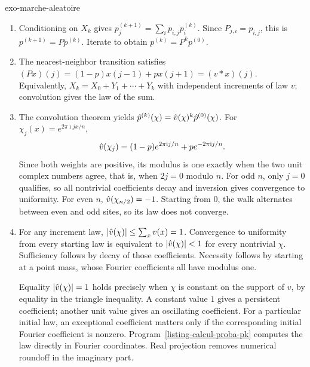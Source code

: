 \begin{correction}{exo-marche-aleatoire}
\begin{enumerate}
\item Conditioning on $X_k$ gives
$p^{(k+1)}_j=\sum_i p_{i,j}p^{(k)}_i$.
Since $P_{j,i}=p_{i,j}$, this is $p^{(k+1)}=Pp^{(k)}$. Iterate to obtain
$p^{(k)}=P^kp^{(0)}$.
\item The nearest-neighbor transition satisfies
$(Px)(j)=(1-p)x(j-1)+px(j+1)=(v*x)(j)$.
Equivalently, $X_k=X_0+Y_1+\cdots+Y_k$ with independent increments of law $v$;
convolution gives the law of the sum.
\item The convolution theorem yields
$\hat{p}^{(k)}(\chi)=\hat{v}(\chi)^k\hat{p}^{(0)}(\chi)$.
For $\chi_j(x)=e^{2\pi\imath jx/n}$,
\[
 \hat{v}(\chi_j)=(1-p)e^{2\pi\mathrm{i} j/n}+pe^{-2\pi\mathrm{i} j/n}.
\]
Since both weights are positive, its modulus is one exactly when the two
unit complex numbers agree, that is, when $2j=0$ modulo $n$.
For odd $n$, only $j=0$ qualifies, so all nontrivial coefficients decay and
inversion gives convergence to uniformity. For even $n$,
$\hat{v}(\chi_{n/2})=-1$. Starting from $0$, the walk alternates between even
and odd sites, so its law does not converge.
\item For any increment law, $|\hat{v}(\chi)|\leq\sum_xv(x)=1$.
Convergence to uniformity from every starting law is equivalent to
$|\hat{v}(\chi)|<1$ for every nontrivial $\chi$. Sufficiency follows by decay
of those coefficients. Necessity follows by starting at a point mass, whose
Fourier coefficients all have modulus one.

Equality $|\hat{v}(\chi)|=1$ holds precisely when $\chi$ is constant on the
support of $v$, by equality in the triangle inequality. A constant value
$1$ gives a persistent coefficient; another unit value gives an oscillating
coefficient. For a particular initial law, an exceptional coefficient matters
only if the corresponding initial Fourier coefficient is nonzero.
Program~\ref{listing-calcul-proba-pk} computes the law directly in Fourier
coordinates. Real projection removes numerical roundoff in the imaginary part.
\begin{listing}[H]
\caption{The probability law after $k$ steps of a cyclic random walk.}
\label{listing-calcul-proba-pk}
\end{listing}
\end{enumerate}
\end{correction}

